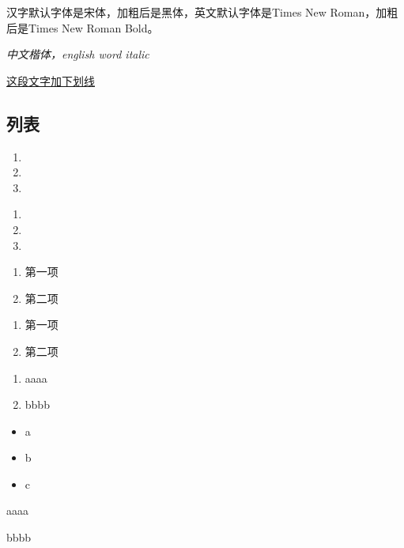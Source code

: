 \documentclass[draft,14pt]{extarticle}%
\begin{document}
汉字默认字体是宋体，加粗后是黑体，英文默认字体是Times New Roman，加粗后是Times New Roman Bold。

\textit{中文楷体，english word italic}%

\underline{这段文字加下划线}



\subsection{列表}
\begin{enumerate}%
    \item \lipsum[1]
    \item \lipsum[1]
    \item \lipsum[1]
\end{enumerate}
\begin{enumerate}[nosep] %
    \item \lipsum[1]
    \item \lipsum[1]
    \item \lipsum[1]
\end{enumerate}
\begin{enumerate}[label=(\arabic*)]%
    \item 第一项
    \item 第二项
\end{enumerate}
\begin{enumerate}[nosep,label=\alph*]%
    \item 第一项
    \item 第二项%
\end{enumerate}
\begin{enumerate}[label=\textbf{操作顺序\arabic*}:,align=left]
    \item aaaa
    \item bbbb
\end{enumerate}
\begin{itemize}[nosep]%
    \item a
    \item b
    \item c
\end{itemize}
\begin{description}[nosep]%
    \item[第一项] aaaa
    \item[第二项] bbbb
\end{description}
\end{document}
